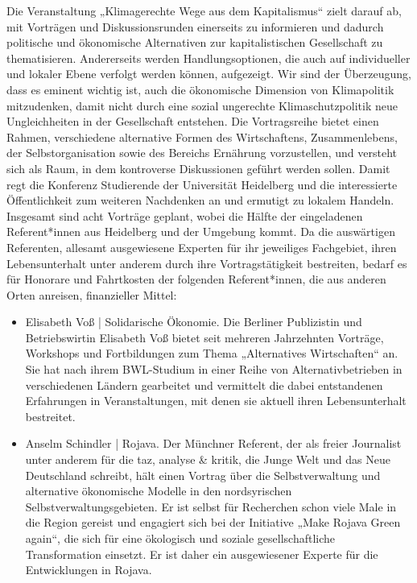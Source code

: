 {    Die Veranstaltung „Klimagerechte Wege aus dem Kapitalismus“ zielt darauf ab, mit Vorträgen und Diskussionsrunden einerseits zu informieren und dadurch politische und ökonomische Alternativen zur kapitalistischen Gesellschaft zu thematisieren. Andererseits werden Handlungsoptionen, die auch auf individueller und lokaler Ebene verfolgt werden können, aufgezeigt. Wir sind der Überzeugung, dass es eminent wichtig ist, auch die ökonomische Dimension von Klimapolitik mitzudenken, damit nicht durch eine sozial ungerechte Klimaschutzpolitik neue Ungleichheiten in der Gesellschaft entstehen. Die Vortragsreihe bietet einen Rahmen, verschiedene alternative Formen des Wirtschaftens, Zusammenlebens, der Selbstorganisation sowie des Bereichs Ernährung vorzustellen, und versteht sich als Raum, in dem kontroverse Diskussionen geführt werden sollen. Damit regt die Konferenz Studierende der Universität Heidelberg und die interessierte Öffentlichkeit zum weiteren Nachdenken an und ermutigt zu lokalem Handeln.\\
    Insgesamt sind acht Vorträge geplant, wobei die Hälfte der eingeladenen Referent*innen aus Heidelberg und der Umgebung kommt. Da die auswärtigen Referenten, allesamt ausgewiesene Experten für ihr jeweiliges Fachgebiet, ihren Lebensunterhalt unter anderem durch ihre Vortragstätigkeit bestreiten, bedarf es für Honorare und Fahrtkosten der folgenden Referent*innen, die aus anderen Orten anreisen, finanzieller Mittel:
    \begin{itemize}
        \item Elisabeth Voß | Solidarische Ökonomie. Die Berliner Publizistin und Betriebswirtin Elisabeth Voß bietet seit mehreren Jahrzehnten Vorträge, Workshops und Fortbildungen zum Thema „Alternatives Wirtschaften“ an. Sie hat nach ihrem BWL-Studium in einer Reihe von Alternativbetrieben in verschiedenen Ländern gearbeitet und vermittelt die dabei entstandenen Erfahrungen in Veranstaltungen, mit denen sie aktuell ihren Lebensunterhalt bestreitet.
        \item Anselm Schindler | Rojava. Der Münchner Referent, der als freier Journalist unter anderem für die taz, analyse \& kritik, die Junge Welt und das Neue Deutschland schreibt, hält einen Vortrag über die Selbstverwaltung und alternative ökonomische Modelle in den nordsyrischen Selbstverwaltungsgebieten. Er ist selbst für Recherchen schon viele Male in die Region gereist und engagiert sich bei der Initiative „Make Rojava Green again“, die sich für eine ökologisch und soziale gesellschaftliche Transformation einsetzt. Er ist daher ein ausgewiesener Experte für die Entwicklungen in Rojava.

\end{itemize}}
